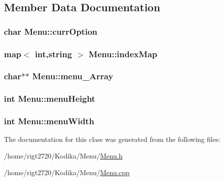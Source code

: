 \subsection{Member Data Documentation}
\hypertarget{classMenu_a8cabd1390fcc59aba53b79788915c792}{
\subsubsection[{curr\-Option}]{\setlength{\rightskip}{0pt plus 5cm}char Menu\-::curr\-Option\hspace{0.3cm}{\ttfamily [protected]}}}\label{classMenu_a8cabd1390fcc59aba53b79788915c792}
\hypertarget{classMenu_a6761c21ec3e1d3a5295479443e7c1a90}{
\subsubsection[{index\-Map}]{\setlength{\rightskip}{0pt plus 5cm}map$<$ int,string $>$ Menu\-::index\-Map\hspace{0.3cm}{\ttfamily [protected]}}}\label{classMenu_a6761c21ec3e1d3a5295479443e7c1a90}
\hypertarget{classMenu_a6fdd29d716c7fb985f038ddde93794a0}{
\subsubsection[{menu\-\_\-\-Array}]{\setlength{\rightskip}{0pt plus 5cm}char$\ast$$\ast$ Menu\-::menu\-\_\-\-Array\hspace{0.3cm}{\ttfamily [private]}}}\label{classMenu_a6fdd29d716c7fb985f038ddde93794a0}
\hypertarget{classMenu_ad9364e391e91acd266444a2604cb838e}{
\subsubsection[{menu\-Height}]{\setlength{\rightskip}{0pt plus 5cm}int Menu\-::menu\-Height\hspace{0.3cm}{\ttfamily [protected]}}}\label{classMenu_ad9364e391e91acd266444a2604cb838e}
\hypertarget{classMenu_a5c90eda61cd9071dcafda04569dfdd67}{
\subsubsection[{menu\-Width}]{\setlength{\rightskip}{0pt plus 5cm}int Menu\-::menu\-Width\hspace{0.3cm}{\ttfamily [protected]}}}\label{classMenu_a5c90eda61cd9071dcafda04569dfdd67}


The documentation for this class was generated from the following files\-:\begin{DoxyCompactItemize}
\item 
/home/rigt2720/\-Kodika/\-Menu/\hyperlink{Menu_8h}{Menu.\-h}\item 
/home/rigt2720/\-Kodika/\-Menu/\hyperlink{Menu_8cpp}{Menu.\-cpp}\end{DoxyCompactItemize}
